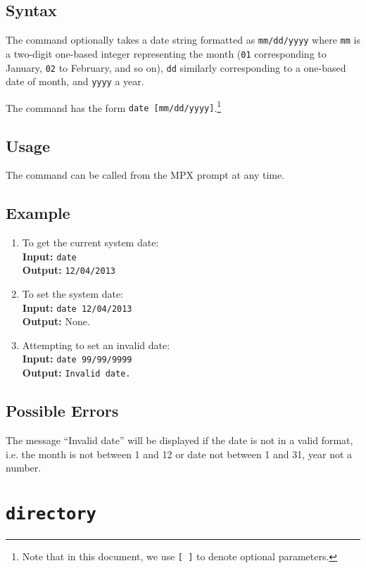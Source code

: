 \subsection{Syntax}
The command optionally takes a date string formatted as {\tt mm/dd/yyyy} where {\tt mm}
is a two-digit one-based integer representing the month ({\tt 01} corresponding to January,
{\tt 02} to February, and so on), {\tt dd} similarly corresponding to a one-based date of
month, and {\tt yyyy} a year.

The command has the form {\tt date [mm/dd/yyyy]}.\footnote{Note that in this document, we 
use {\tt [ ]} to denote optional parameters.}

\subsection{Usage}
The command can be called from the MPX prompt at any time.

\subsection{Example}
\begin{enumerate}
    \item To get the current system date: \\
        {\bf Input:} {\tt date} \\
        {\bf Output:} {\tt 12/04/2013}
    \item To set the system date: \\
        {\bf Input:} {\tt date 12/04/2013} \\
        {\bf Output:} None.
    \item Attempting to set an invalid date: \\
        {\bf Input:} {\tt date 99/99/9999} \\
        {\bf Output:} {\tt Invalid date.}
\end{enumerate}
\subsection{Possible Errors}
The message ``Invalid date'' will be displayed if the date is not in a valid format, i.e.
the month is not between 1 and 12 or date not between 1 and 31, year not a number.








\section{\tt directory}
\label{directory_cmd}

